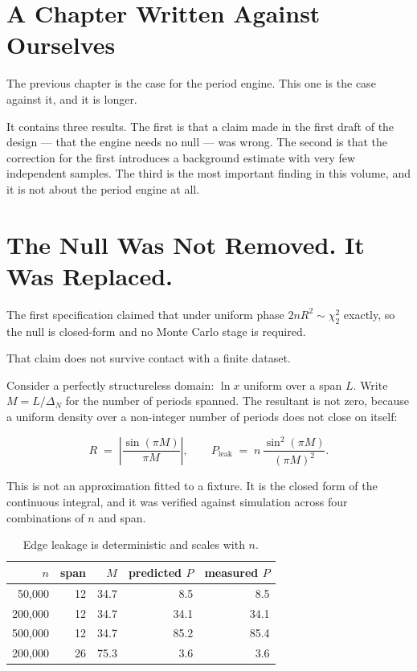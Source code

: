 \documentclass[11pt, letterpaper, openany]{book}
\begin{document}
\section{A Chapter Written Against Ourselves}

The previous chapter is the case for the period engine. This one is the case against it, and it
is longer.

It contains three results. The first is that a claim made in the first draft of the design ---
that the engine needs no null --- was wrong. The second is that the correction for the first
introduces a background estimate with very few independent samples. The third is the most
important finding in this volume, and it is not about the period engine at all.

\section{The Null Was Not Removed. It Was Replaced.}

The first specification claimed that under uniform phase $2nR^2 \sim \chi^2_2$ exactly, so the
null is closed-form and no Monte Carlo stage is required.

That claim does not survive contact with a finite dataset.

Consider a perfectly structureless domain: $\ln x$ uniform over a span $L$. Write $M = L/\Delta_N$
for the number of periods spanned. The resultant is not zero, because a uniform density over a
non-integer number of periods does not close on itself:

\begin{equation}
R \;=\; \left| \frac{\sin(\pi M)}{\pi M} \right|, \qquad
P_{\text{leak}} \;=\; n\,\frac{\sin^2(\pi M)}{(\pi M)^2} .
\label{eq:leak}
\end{equation}

This is not an approximation fitted to a fixture. It is the closed form of the continuous
integral, and it was verified against simulation across four combinations of $n$ and span.

\begin{table}[H]
\centering
\small
\begin{tabular}{@{}rrrrr@{}}
\toprule
$n$ & span & $M$ & \textbf{predicted $P$} & \textbf{measured $P$} \\
\midrule
50{,}000 & 12 & 34.7 & 8.5 & 8.5 \\
200{,}000 & 12 & 34.7 & 34.1 & 34.1 \\
500{,}000 & 12 & 34.7 & 85.2 & 85.4 \\
200{,}000 & 26 & 75.3 & 3.6 & 3.6 \\
\bottomrule
\end{tabular}
\caption{Edge leakage is deterministic and scales with $n$.}
\end{table}
\end{document}
